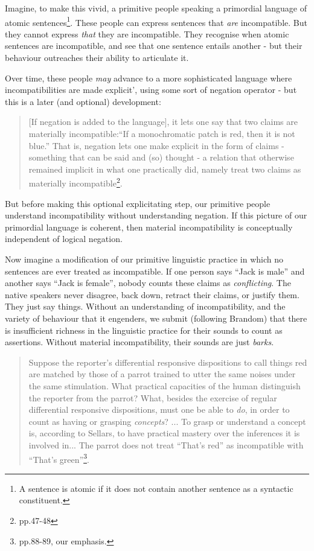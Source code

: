 Imagine, to make this vivid, a primitive people speaking a primordial
language of atomic sentences\footnote{A sentence is atomic if it does
  not contain another sentence as a syntactic constituent.}. These people can express sentences
that \emph{are} incompatible.  But they cannot express \emph{that}
they are incompatible.  They recognise when atomic sentences are
incompatible, and see that one sentence entails another - but their
behaviour outreaches their ability to articulate it.

Over time, these people \emph{may} advance to a more
sophisticated language where incompatibilities are made explicit', using some sort of negation operator - but this is a later (and optional) development:
\begin{quote}
[If negation is added to the language], it lets one say that two
claims are materially incompatible:``If a monochromatic patch is red,
then it is not blue.'' That is, negation lets one make explicit in the
form of claims - something that can be said and (so) thought - a
relation that otherwise remained implicit in what one practically did,
namely treat two claims as materially
incompatible\footnote{\cite{brandom} pp.47-48}.
\end{quote}

\NI But before making this optional
explicitating step, our primitive people understand incompatibility
without understanding negation.  If this picture of our primordial
language is coherent, then material incompatibility is conceptually
independent of logical negation.

Now imagine a modification of our primitive linguistic practice in
which no sentences are ever treated as incompatible.  If one person
says ``Jack is male'' and another says ``Jack is female'', nobody
counts these claims as \emph{conflicting}.  The native speakers never
disagree, back down, retract their claims, or justify them. They just
say things.  Without an understanding of incompatibility, and the
variety of behaviour that it engenders, we submit (following Brandom)
that there is insufficient richness in the linguistic practice for
their sounds to count as assertions.  Without material
incompatibility, their sounds are just \emph{barks}.
\begin{quote}

  Suppose the reporter's differential responsive dispositions to call
  things red are matched by those of a parrot trained to utter the
  same noises under the same stimulation. What practical capacities of
  the human distinguish the reporter from the parrot? What, besides
  the exercise of regular differential responsive dispositions, must
  one be able to \emph{do}, in order to count as having or grasping
  \emph{concepts}? ... To grasp or understand a concept is, according
  to Sellars, to have practical mastery over the inferences it is
  involved in... The parrot does not treat ``That's red'' as
  incompatible with ``That's green''\footnote{\cite{brandom2}
    pp.88-89, our emphasis.}.
\end{quote}

